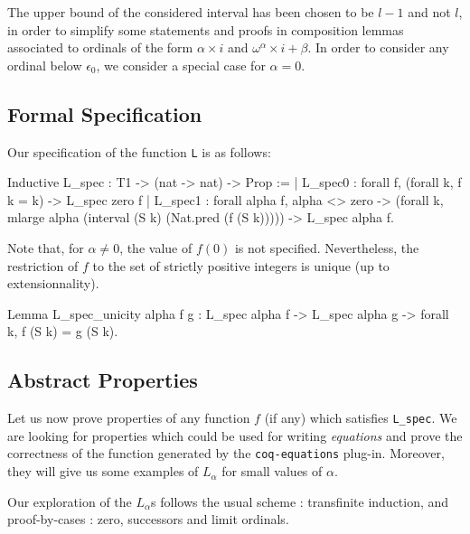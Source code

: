 \begin{remark}
The upper bound of the considered interval has been chosen to be  $l-1$ and not $l$, in order to simplify some statements and proofs in composition lemmas associated to ordinals of the form $\alpha\times i$ and 
$\omega^\alpha\times i + \beta$.
In order to consider any ordinal below $\epsilon_0$, we consider a special case for $\alpha=0$.
\end{remark}


\subsection{Formal Specification}

Our specification of the function \texttt{L} is as follows:

\begin{Coqsrc}
Inductive L_spec : T1 -> (nat -> nat) -> Prop :=
| L_spec0 : forall f, (forall k, f k = k) ->  L_spec zero f
| L_spec1 : forall alpha f,
    alpha <> zero ->
    (forall k, mlarge alpha (interval (S k) (Nat.pred (f (S k))))) ->
    L_spec alpha f.
\end{Coqsrc}


Note that, for $\alpha\not=0$, the value of $f(0)$ is not specified.
Nevertheless, the restriction of $f$ to the set of strictly positive integers is unique (up to extensionnality).

\begin{Coqsrc}
Lemma L_spec_unicity alpha f g :
  L_spec alpha f -> L_spec alpha g -> forall k, f (S k) = g (S k).
\end{Coqsrc}


\subsection{Abstract Properties}



Let us now prove properties of any function $f$ (if any) which satisfies 
\texttt{L\_spec}. We are looking for properties which could be used for writing \emph{equations} and prove the correctness of the function generated by the \texttt{coq-equations} plug-in. Moreover, they will give us some examples of
$L_\alpha$ for small values of $\alpha$. 


Our exploration of the $L_\alpha$s  follows the usual scheme : transfinite induction, and proof-by-cases : zero, successors and limit ordinals.


